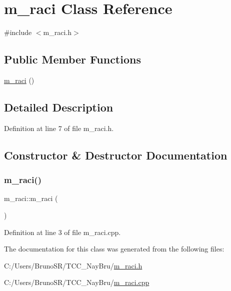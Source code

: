 \hypertarget{classm__raci}{}\section{m\+\_\+raci Class Reference}
\label{classm__raci}


{\ttfamily \#include $<$m\+\_\+raci.\+h$>$}

\subsection*{Public Member Functions}
\begin{DoxyCompactItemize}
\item 
\hyperlink{classm__raci_a71d7d00d85715a7716ad487c1b125eb7}{m\+\_\+raci} ()
\end{DoxyCompactItemize}


\subsection{Detailed Description}


Definition at line 7 of file m\+\_\+raci.\+h.



\subsection{Constructor \& Destructor Documentation}
\hypertarget{classm__raci_a71d7d00d85715a7716ad487c1b125eb7}{}\label{classm__raci_a71d7d00d85715a7716ad487c1b125eb7} 
\subsubsection{\texorpdfstring{m\+\_\+raci()}{m\_raci()}}
{\footnotesize\ttfamily m\+\_\+raci\+::m\+\_\+raci (\begin{DoxyParamCaption}{ }\end{DoxyParamCaption})}



Definition at line 3 of file m\+\_\+raci.\+cpp.



The documentation for this class was generated from the following files\+:\begin{DoxyCompactItemize}
\item 
C\+:/\+Users/\+Bruno\+S\+R/\+T\+C\+C\+\_\+\+Nay\+Bru/\hyperlink{m__raci_8h}{m\+\_\+raci.\+h}\item 
C\+:/\+Users/\+Bruno\+S\+R/\+T\+C\+C\+\_\+\+Nay\+Bru/\hyperlink{m__raci_8cpp}{m\+\_\+raci.\+cpp}\end{DoxyCompactItemize}
